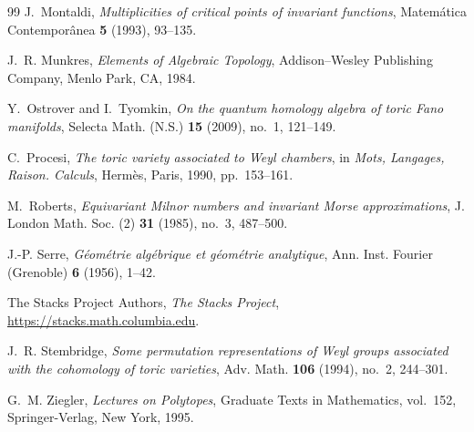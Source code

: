 \documentclass[12pt]{amsart}
\theoremstyle{remark}
\begin{document}
\begin{thebibliography}{99}
J.~Montaldi,
\emph{Multiplicities of critical points of invariant functions},
Matem\'atica Contempor\^anea \textbf{5} (1993), 93--135.

J.~R. Munkres,
\emph{Elements of Algebraic Topology},
Addison--Wesley Publishing Company, Menlo Park, CA, 1984.

 Y.~Ostrover and I.~Tyomkin,
 \emph{On the quantum homology algebra of toric Fano manifolds},
 Selecta Math. (N.S.) \textbf{15} (2009), no.~1, 121--149.

C.~Procesi,
\emph{The toric variety associated to Weyl chambers},
in \emph{Mots, Langages, Raison. Calculs}, Herm\`es, Paris, 1990,
pp.~153--161.

M.~Roberts,
\emph{Equivariant Milnor numbers and invariant Morse approximations},
J. London Math. Soc. (2) \textbf{31} (1985), no.~3, 487--500.

 J.-P. Serre,
 \emph{G\'eom\'etrie alg\'ebrique et g\'eom\'etrie analytique},
 Ann. Inst. Fourier (Grenoble) \textbf{6} (1956), 1--42.

The Stacks Project Authors,
\emph{The Stacks Project},
\url{https://stacks.math.columbia.edu}.

J.~R. Stembridge,
\emph{Some permutation representations of Weyl groups associated with the
cohomology of toric varieties},
Adv. Math. \textbf{106} (1994), no.~2, 244--301.

G.~M. Ziegler,
\emph{Lectures on Polytopes},
Graduate Texts in Mathematics, vol.~152,
Springer-Verlag, New York, 1995.

\end{thebibliography}
\end{document}
